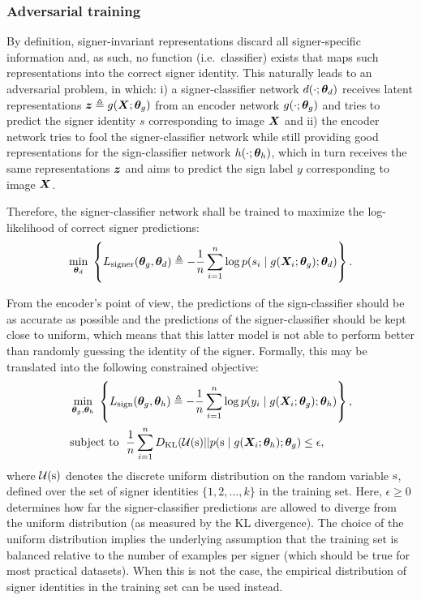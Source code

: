

\subsubsection{Adversarial training}
By definition, signer-invariant representations discard all signer-specific information and, as such, no function (i.e.\ classifier) exists that maps such representations into the correct signer identity. This naturally leads to an adversarial problem, in which: i) a signer-classifier network $d(\cdot; {\bm{\theta}}_d)$ receives latent representations ${\bm{z}} \triangleq g({\bm{X}};{\bm{\theta}}_g)$ from an encoder network $g(\cdot;{\bm{\theta}}_g)$ and tries to predict the signer identity $s$ corresponding to image ${\bm{X}}$ and ii) the encoder network tries to fool the signer-classifier network while still providing good representations for the sign-classifier network $h(\cdot; {\bm{\theta}}_h)$, which in turn receives the same representations ${\bm{z}}$ and aims to predict the sign label $y$ corresponding to image ${\bm{X}}$.

Therefore, the signer-classifier network shall be trained to maximize the log-likelihood of correct signer predictions:
\begin{equation}
    \label{eq:signer_loss}
    \min_{{\bm{\theta}}_d} \; \left\lbrace L_{\text{signer}}({\bm{\theta}}_g, {\bm{\theta}}_d) \triangleq -\frac{1}{n}\sum_{i=1}^n \log p(s_i \mid g({\bm{X}}_{i}; {\bm{\theta}}_g); {\bm{\theta}}_d) \right\rbrace.
\end{equation}

From the encoder's point of view, the predictions of the sign-classifier should be as accurate as possible and the predictions of the signer-classifier should be kept close to uniform, which means that this latter model is not able to perform better than randomly guessing the identity of the signer. Formally, this may be translated into the following constrained objective:
\begin{align}
    \label{eq:sign_loss}
    &\min_{{\bm{\theta}}_g, {\bm{\theta}}_h} \; \left\lbrace L_{\text{sign}}({\bm{\theta}}_g, {\bm{\theta}}_h)\triangleq-\frac{1}{n}\sum_{i=1}^n \log p(y_i \mid g({\bm{X}}_{i}; {\bm{\theta}}_g); {\bm{\theta}}_h)\right\rbrace,\\
    \label{eq:kl_obj}
    &\text{subject to } \; \frac{1}{n}\sum_{i=1}^n D_{\mathrm{KL}}({\mathcal{U}}({\textnormal{s}}) || p({\textnormal{s}} \mid g({\bm{X}}_{i}; {\bm{\theta}}_h); {\bm{\theta}}_g) \leq \epsilon,
\end{align}
where ${\mathcal{U}}({\textnormal{s}})$ denotes the discrete uniform distribution on the random variable ${\textnormal{s}}$, defined over the set of signer identities $\{1, 2, \dots, k\}$ in the training set. Here, $\epsilon \geq 0$ determines how far the signer-classifier predictions are allowed to diverge from the uniform distribution (as measured by the KL divergence). The choice of the uniform distribution implies the underlying assumption that the training set is balanced relative to the number of examples per signer (which should be true for most practical datasets). When this is not the case, the empirical distribution of signer identities in the training set can be used instead.

